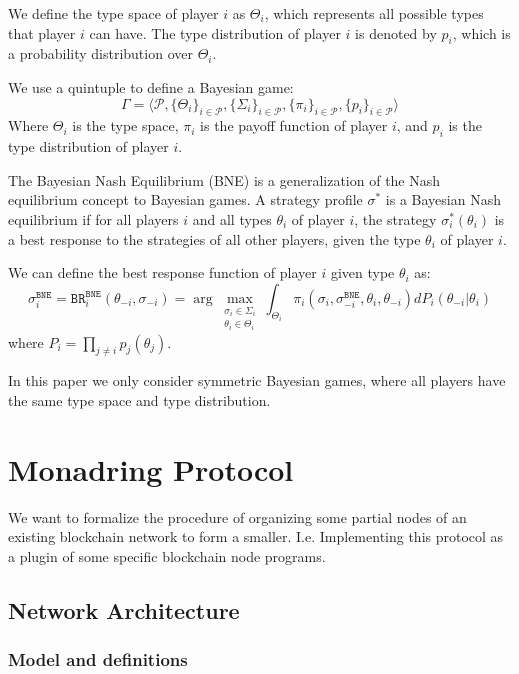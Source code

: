 \documentclass[11pt]{article}
\begin{document}
We define the type space of player $i$ as $\Theta_i$, which represents all possible types that player $i$ can have. The type distribution of player $i$ is denoted by $p_i$, which is a probability distribution over $\Theta_i$.

We use a quintuple to define a Bayesian game:
\begin{equation}
\Gamma = \langle \mathcal{P}, \{\Theta_i\}_{i\in\mathcal{P}}, \{\Sigma_i\}_{i\in\mathcal{P}}, \{\pi_i\}_{i\in\mathcal{P}}, \{p_i\}_{i\in\mathcal{P}} \rangle
\end{equation}
Where $\Theta_i$ is the type space, $\pi_i$ is the payoff function of player $i$, and $p_i$ is the type distribution of player $i$.

The Bayesian Nash Equilibrium (BNE) is a generalization of the Nash equilibrium concept to Bayesian games. A strategy profile $\sigma^*$ is a Bayesian Nash equilibrium if for all players $i$ and all types $\theta_i$ of player $i$, the strategy $\sigma_i^*(\theta_i)$ is a best response to the strategies of all other players, given the type $\theta_i$ of player $i$.

We can define the best response function of player $i$ given type $\theta_i$ as:
\begin{equation}
\sigma^\texttt{BNE}_i=\texttt{BR}^\texttt{BNE}_i(\theta_{-i},\sigma_{-i}) = \arg\max_{\substack{\sigma_i \in \Sigma_i \\ \theta_i\in \Theta_i}} \int_{\Theta_i} \pi_i(\sigma_i,\sigma^\texttt{BNE}_{-i},\theta_i,\theta_{-i})dP_i(\theta_{-i}|\theta_i)
\end{equation}
where $P_i=\prod_{j\neq i}p_j(\theta_j)$.

In this paper we only consider symmetric Bayesian games, where all players have the same type space and type distribution.

\section{Monadring Protocol}
We want to formalize the procedure of organizing some partial nodes of an existing blockchain network to form a smaller.
I.e. Implementing this protocol as a plugin of some specific blockchain node programs.
\subsection{Network Architecture}
\subsubsection{Model and definitions}
\end{document}

